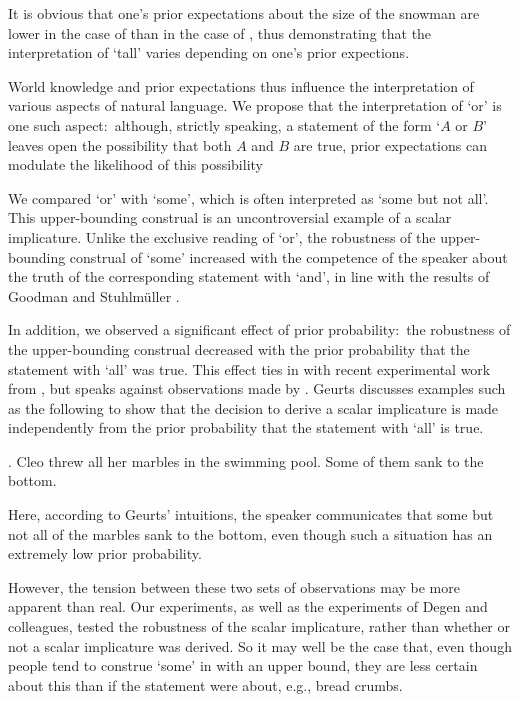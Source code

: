 \documentclass[12pt]{article}
\begin{document}
It is obvious that one's prior expectations about the size of the snowman are lower in the case of \Last[a] than in the case of \Last[b], thus demonstrating that the interpretation of `tall' varies depending on one's prior expections.

World knowledge and prior expectations thus influence the interpretation of various aspects of natural language. We propose that the interpretation of `or' is one such aspect:\ although, strictly speaking, a statement of the form `$A$ or $B$' leaves open the possibility that both $A$ and $B$ are true, prior expectations can modulate the likelihood of this possibility

We compared `or' with `some', which is often interpreted as `some but not all'. This upper-bounding construal is an uncontroversial example of a scalar implicature. Unlike the exclusive reading of `or', the robustness of the upper-bounding construal of `some' increased with the competence of the speaker about the truth of the corresponding statement with `and', in line with the results of Goodman and Stuhlm\"{u}ller \citeyearpar{goodman2013}. 

In addition, we observed a significant effect of prior probability:\ the robustness of the upper-bounding construal decreased with the prior probability that the statement with `all' was true. This effect ties in with recent experimental work from \citet{degen2015}, but speaks against observations made by \citet{geurts2010}. Geurts discusses examples such as the following to show that the decision to derive a scalar implicature is made independently from the prior probability that the statement with `all' is true.

\ex.	Cleo threw all her marbles in the swimming pool. Some of them sank to the bottom.

Here, according to Geurts' intuitions, the speaker communicates that some but not all of the marbles sank to the bottom, even though such a situation has an extremely low prior probability.

However, the tension between these two sets of observations may be more apparent than real. Our experiments, as well as the experiments of Degen and colleagues, tested the robustness of the scalar implicature, rather than whether or not a scalar implicature was derived. So it may well be the case that, even though people tend to construe `some' in \Last with an upper bound, they are less certain about this than if the statement were about, e.g., bread crumbs. 
\end{document}
